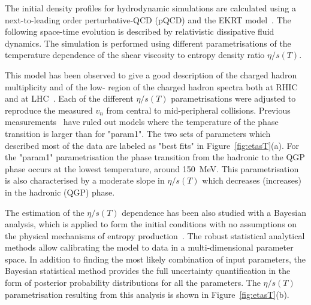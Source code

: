 The initial density profiles for hydrodynamic simulations are calculated using a next-to-leading order perturbative-QCD (pQCD) and the EKRT model~\cite{Paatelainen:2012at,Paatelainen:2013eea}. The following space-time evolution is described by relativistic dissipative fluid dynamics. The simulation is performed using different parametrisations of the temperature dependence of the shear viscosity to entropy density ratio $\eta/s(T)$. 

This model has been observed to give a good description of the charged hadron multiplicity and of the low-\pt{} region of the charged hadron spectra both at RHIC and at LHC~\cite{Niemi:2015qia}. Each of the different $\eta/s(T)$ parametrisations were adjusted to reproduce the measured $v_n$ from central to mid-peripheral collisions.
Previous measurements~\cite{ALICE:2016kpq} have ruled out models where the temperature of the phase transition is larger than for "param1".
The two sets of parameters which described most of the data are labeled as "best fits" in Figure~\ref{fig:etasT}(a).
For the "param1" parametrisation the phase transition from the hadronic to the QGP phase occurs at the lowest temperature, around 150~MeV. This parametrisation is also characterised by a moderate slope in $\eta/s(T)$ which decreases (increases) in the hadronic (QGP) phase.

The estimation of the $\eta/s(T)$ dependence has been also studied with a Bayesian analysis, which is applied to form the initial conditions with no assumptions on the physical mechanisms of entropy production~\cite{Bernhard:2016bar}. The robust statistical analytical methods allow calibrating the model to data in a multi-dimensional parameter space. In addition to finding the most likely combination of input parameters, the Bayesian statistical method provides the full uncertainty quantification in the form of posterior probability distributions for all the parameters. The $\eta/s(T)$ parametrisation resulting from this analysis is shown in Figure~\ref{fig:etasT}(b).

